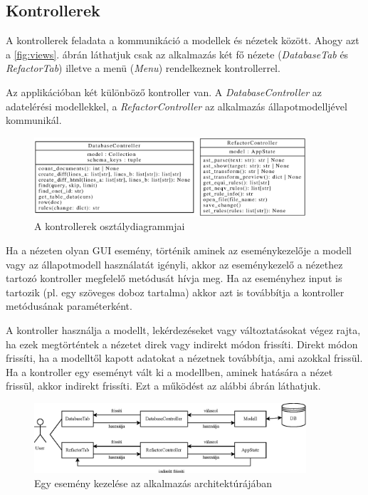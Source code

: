 \subsection{Kontrollerek}

A kontrollerek feladata a kommunikáció a modellek és nézetek között.
Ahogy azt a \ref{fig:views}. ábrán láthatjuk csak az alkalmazás
két fő nézete (\emph{DatabaseTab} és \emph{RefactorTab})
illetve a menü (\emph{Menu}) rendelkeznek kontrollerrel.

Az applikációban két különböző kontroller van.
A \emph{DatabaseController} az adatelérési modellekkel,
a \emph{RefactorController} az alkalmazás állapotmodelljével kommunikál.

\begin{figure}[H]
	\centering
	\includegraphics[width=0.9\textwidth]{images/uml/controllers.eps}
	\caption{\label{fig:controllers}A kontrollerek osztálydiagrammjai}
\end{figure}

Ha a nézeten olyan GUI esemény, történik aminek az eseménykezelője
a modell vagy az állapotmodell használatát igényli,
akkor az eseménykezelő a nézethez tartozó kontroller megfelelő metódusát hívja meg.
Ha az eseményhez input is tartozik (pl. egy szöveges doboz tartalma) akkor
azt is továbbítja a kontroller metódusának paraméterként.

A kontroller használja a modellt, lekérdezéseket vagy változtatásokat végez rajta,
ha ezek megtörténtek a nézetet direk vagy indirekt módon frissíti.
Direkt módon frissíti, ha a modelltől kapott adatokat a nézetnek továbbítja,
ami azokkal frissül.
Ha a kontroller egy eseményt vált ki a modellben, aminek hatására a nézet frissül,
akkor indirekt frissíti.
Ezt a működést az alábbi ábrán láthatjuk.

\begin{figure}[H]
	\centering
	\includegraphics[width=0.9\textwidth]{images/figs/MVC.eps}
	\caption{Egy esemény kezelése az alkalmazás architektúrájában}
\end{figure}

